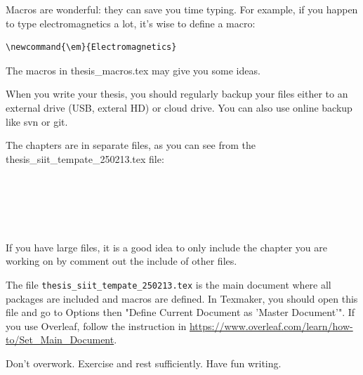 \ben
 
\item Macros are wonderful: they can save you time typing. For example, if you happen to type electromagnetics a lot, it's wise to define a macro:
\begin{verbatim}
\newcommand{\em}{Electromagnetics}
\end{verbatim} 
The macros in thesis\_macros.tex may give you some ideas.

\item When you write your thesis, you should regularly backup your files either to an external drive (USB, exteral HD) or cloud drive. You can also use online backup like svn or git.

\item The chapters are in separate files, as you can see from the thesis\_siit\_tempate\_250213.tex file:
\begin{lstlisting}





\end{lstlisting}

If you have large files, it is a good idea to only include the chapter you are working on by comment out the include of other files.

\item The file \verb|thesis_siit_tempate_250213.tex| is the main document where all packages are included and macros are defined. In Texmaker, you should open this file and go to Options then "Define Current Document as 'Master Document'". If you use Overleaf, follow the instruction in \url{https://www.overleaf.com/learn/how-to/Set_Main_Document}.
\item Don't overwork. Exercise and rest sufficiently. Have fun writing.

\een